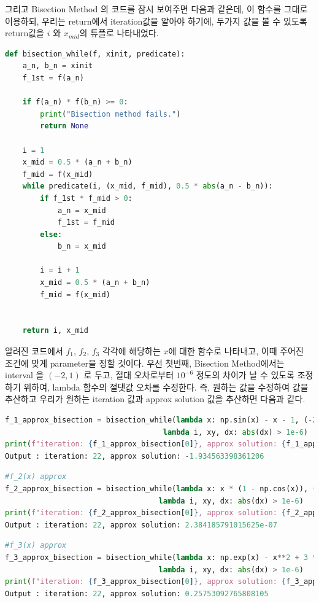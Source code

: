 \documentclass[11pt]{article}
\begin{document}
\noindent
그리고 Bisection Method 의 코드를 잠시 보여주면 다음과 같은데, 이 함수를 그대로 이용하되, 우리는 return에서 iteration값을 알아야 하기에, 두가지 값을 볼 수 있도록 return값을 $i$ 와 $x_{mid}$의 튜플로 나타내었다.

\begin{lstlisting}[language=Python]
def bisection_while(f, xinit, predicate):
    a_n, b_n = xinit
    f_1st = f(a_n)

    if f(a_n) * f(b_n) >= 0:
        print("Bisection method fails.")
        return None

    i = 1
    x_mid = 0.5 * (a_n + b_n)
    f_mid = f(x_mid)
    while predicate(i, (x_mid, f_mid), 0.5 * abs(a_n - b_n)):
        if f_1st * f_mid > 0:
            a_n = x_mid
            f_1st = f_mid
        else:
            b_n = x_mid

        i = i + 1
        x_mid = 0.5 * (a_n + b_n)
        f_mid = f(x_mid)
        

    return i, x_mid
\end{lstlisting}

\noindent
알려진 코드에서 $f_1$, $f_2$, $f_3$ 각각에 해당하는 $x$에 대한 함수로 나타내고, 이때 주어진 조건에 맞게 parameter을 정할 것이다. 우선 첫번째, Bisection Method에서는 interval 을 $(-2, 1)$ 로 두고, 절대 오차로부터 $10^{-6}$ 정도의 차이가 날 수 있도록 조정하기 위하여, lambda 함수의 절댓값 오차를 수정한다. 즉, 원하는 값을 수정하여 값을 추산하고 우리가 원하는 iteration 값과 approx solution 값을 추산하면 다음과 같다.

\begin{lstlisting}[language=Python]
f_1_approx_bisection = bisection_while(lambda x: np.sin(x) - x - 1, (-2,1), 
									lambda i, xy, dx: abs(dx) > 1e-6)
print(f"iteration: {f_1_approx_bisection[0]}, approx solution: {f_1_approx_bisection[1]}") 
Output : iteration: 22, approx solution: -1.934563398361206
\end{lstlisting}


\begin{lstlisting}[language=Python]
#f_2(x) approx
f_2_approx_bisection = bisection_while(lambda x: x * (1 - np.cos(x)), (-2,1),
                                   lambda i, xy, dx: abs(dx) > 1e-6)
print(f"iteration: {f_2_approx_bisection[0]}, approx solution: {f_2_approx_bisection[1]}")
Output : iteration: 22, approx solution: 2.384185791015625e-07
\end{lstlisting}

\begin{lstlisting}[language=Python]
#f_3(x) approx
f_3_approx_bisection = bisection_while(lambda x: np.exp(x) - x**2 + 3 * x - 2, (-2,1),
                                   lambda i, xy, dx: abs(dx) > 1e-6)
print(f"iteration: {f_3_approx_bisection[0]}, approx solution: {f_3_approx_bisection[1]}")
Output : iteration: 22, approx solution: 0.25753092765808105
\end{lstlisting}
\end{document}
